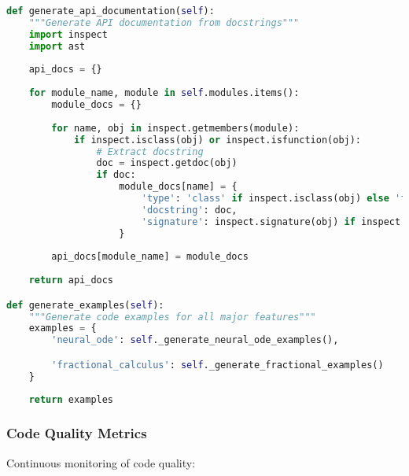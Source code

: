 \begin{lstlisting}[language=Python, caption=Documentation Generation]
def generate_api_documentation(self):
    """Generate API documentation from docstrings"""
    import inspect
    import ast
    
    api_docs = {}
    
    for module_name, module in self.modules.items():
        module_docs = {}
        
        for name, obj in inspect.getmembers(module):
            if inspect.isclass(obj) or inspect.isfunction(obj):
                # Extract docstring
                doc = inspect.getdoc(obj)
                if doc:
                    module_docs[name] = {
                        'type': 'class' if inspect.isclass(obj) else 'function',
                        'docstring': doc,
                        'signature': inspect.signature(obj) if inspect.isfunction(obj) else None
                    }
        
        api_docs[module_name] = module_docs
    
    return api_docs

def generate_examples(self):
    """Generate code examples for all major features"""
    examples = {
        'neural_ode': self._generate_neural_ode_examples(),

        'fractional_calculus': self._generate_fractional_examples()
    }
    
    return examples
\end{lstlisting}

\subsubsection{Code Quality Metrics}

Continuous monitoring of code quality:

